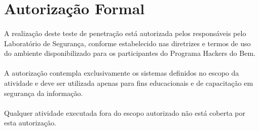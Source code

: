 \section{Autorização Formal}

\paragraph{}
A realização deste teste de penetração está autorizada pelos responsáveis
pelo Laboratório de Segurança, conforme estabelecido nas diretrizes e
termos de uso do ambiente disponibilizado para os participantes do Programa
Hackers do Bem.

\paragraph{}
A autorização contempla exclusivamente os sistemas definidos no escopo da
atividade e deve ser utilizada apenas para fins educacionais e de
capacitação em segurança da informação.

\paragraph{}
Qualquer atividade executada fora do escopo autorizado não está coberta por
esta autorização.

